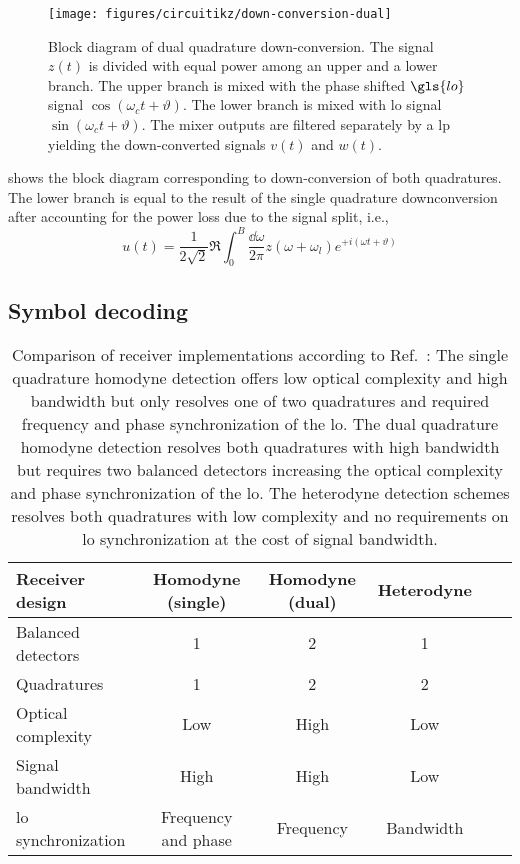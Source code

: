 \begin{figure}[htb]
	\centering
	\texttt{[image: figures/circuitikz/down-conversion-dual]}
	\caption{Block diagram of dual quadrature down-conversion. The signal $z(t)$ is divided with equal power among an upper and a lower branch. The upper branch is mixed with the phase shifted $\gls{lo}$ signal $\cos(\omega_ct+\vartheta)$. The lower branch is mixed with \gls{lo} signal $\sin(\omega_ct+\vartheta)$. The mixer outputs are filtered separately by a \gls{lp} yielding the down-converted signals $v(t)$ and $w(t)$.}\label{fig:down_conversion_dual}
\end{figure}
 shows the block diagram corresponding to down-conversion of both quadratures.
The lower branch is equal to the result of the single quadrature downconversion after accounting for the power loss due to the signal split, i.e.,
\begin{equation}
	u(t)
	=
	\frac{1}{2\sqrt{2}}
	\Re
	\int_0^B\frac{\dd{\omega}}{2\pi}
	z(\omega+\omega_l)
	e^{+i(\omega t+\vartheta)}
	\label{eq:down_conversion_real}	
\end{equation}




\FloatBarrier
\subsection{Symbol decoding}

\begin{table}[htb]
  \centering
  \begin{tabular}{lccccc}
    \toprule
    Receiver design & Homodyne (single) & Homodyne (dual) & Heterodyne \\
    \midrule
    Balanced detectors & \num{1} & \num{2} & \num{1} \\
    Quadratures & \num{1} & \num{2} & \num{2} \\
    Optical complexity & Low & High & Low \\
    Signal bandwidth & High & High & Low \\
    \gls{lo} synchronization & Frequency and phase & Frequency & Bandwidth \\
    \bottomrule
  \end{tabular}
  \caption{Comparison of receiver implementations according to Ref.~\cite{Brunner2017}: The single quadrature homodyne detection offers low optical complexity and high bandwidth but only resolves one of two quadratures and required frequency and phase synchronization of the \gls{lo}. The dual quadrature homodyne detection resolves both quadratures with high bandwidth but requires two balanced detectors increasing the optical complexity and phase synchronization of the \gls{lo}. The heterodyne detection schemes resolves both quadratures with low complexity and no requirements on \gls{lo} synchronization at the cost of signal bandwidth.}\label{tab:receivers}
\end{table}

